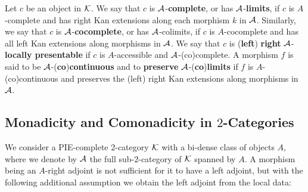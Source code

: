 \begin{definition}\label{def:ALocalPresentability}
    Let $c$ be an object in $\mathcal{K}$. We say that $c$ is $\mathcal{A}$-\textbf{complete}, or has $\mathcal{A}$-\textbf{limits}, if $c$ is $A$-complete and has right Kan extensions along each morphism $k$ in $\mathcal{A}$. Similarly, we say that $c$ is $\mathcal{A}$-\textbf{cocomplete}, or has $\mathcal{A}$-colimits, if $c$ is $A$-cocomplete and has all left Kan extensions along morphisms in $\mathcal{A}$. We say that $c$ is (\textbf{left}) \textbf{right} $\mathcal{A}$-\textbf{locally presentable} if $c$ is $A$-accessible and $\mathcal{A}$-(co)complete. A morphism $f$ is said to be $\mathcal{A}$-(\textbf{co})\textbf{continuous} and to \textbf{preserve} $\mathcal{A}$-(\textbf{co})\textbf{limits} if $f$ is $A$-(co)continuous and preserves the (left) right Kan extensions along morphisms in $\mathcal{A}$.
\end{definition}

\subsection{Monadicity and Comonadicity in \texorpdfstring{$2$}{2}-Categories}

We consider a PIE-complete $2$-category $\mathcal{K}$ with a bi-dense class of objects $A$, where we denote by $\mathcal{A}$ the full sub-$2$-category of $\mathcal{K}$ spanned by $A$. A morphism being an $A$-right adjoint is not sufficient for it to have a left adjoint, but with the following additional assumption we obtain the left adjoint from the local data:

